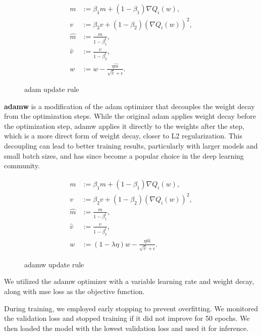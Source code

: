 \begin{figure}[H]
    \begin{align*}
        m       & := \beta_1 m + (1 - \beta_1) \nabla Q_i(w),            \\
        v       & := \beta_2 v + (1 - \beta_2) (\nabla Q_i(w))^2,        \\
        \hat{m} & := \frac{m}{1 - \beta_1^t},                            \\
        \hat{v} & := \frac{v}{1 - \beta_2^t},                            \\
        w       & := w - \frac{\eta \hat{m}}{\sqrt{\hat{v}} + \epsilon}.
    \end{align*}
    \caption{\gls{adam} update rule}
\end{figure}

\textbf{\gls{adamw}} is a modification of the \gls{adam} optimizer that decouples the weight decay
from the optimization steps. While the original \gls{adam} applies weight decay
before the optimization step, \gls{adamw} applies it directly to the weights after
the step, which is a more direct form of weight decay, closer to L2
regularization. This decoupling can lead to better training results,
particularly with larger models and small batch sizes, and has since become a
popular choice in the deep learning community.

\begin{figure}[H]
    \begin{align*}
        m       & := \beta_1 m + (1 - \beta_1) \nabla Q_i(w),                               \\
        v       & := \beta_2 v + (1 - \beta_2) (\nabla Q_i(w))^2,                           \\
        \hat{m} & := \frac{m}{1 - \beta_1^t},                                               \\
        \hat{v} & := \frac{v}{1 - \beta_2^t},                                               \\
        w       & := (1 - \lambda \eta) w - \frac{\eta \hat{m}}{\sqrt{\hat{v}} + \epsilon}.
    \end{align*}
    \caption{\gls{adamw} update rule}
\end{figure}

We utilized the \gls{adamw} optimizer with a variable learning rate and weight
decay, along with \gls{mse} loss as the objective function.

During training, we employed early stopping to prevent overfitting. We
monitored the validation loss and stopped training if it did not improve for 50
epochs. We then loaded the model with the lowest validation loss and used it
for inference.

